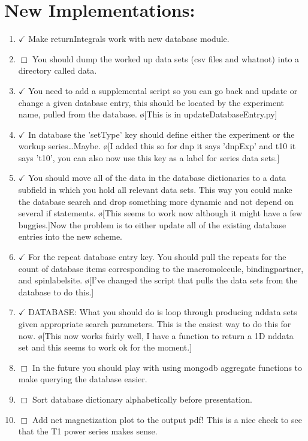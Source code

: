 \documentclass[10pt]{book}
\begin{document}
\section{New Implementations:}
\begin{enumerate}
    \item $\checkmark$ Make returnIntegrals work with new database module.
    \item $\Box$ You should dump the worked up data sets (csv files and whatnot) into a directory called data.
    \item $\checkmark$ You need to add a supplemental script so you can go back and update or change a given database entry, this should be located by the experiment name, pulled from the database. \o[This is in updateDatabaseEntry.py]{}
    \item $\checkmark$ In database the 'setType' key should define either the experiment or the workup series\ldots Maybe. \o[I added this so for dnp it says 'dnpExp' and t10 it says 't10', you can also now use this key as a label for series data sets.]{}
    \item $\checkmark$ You should move all of the data in the database dictionaries to a data subfield in which you hold all relevant data sets. This way you could make the database search and drop something more dynamic and not depend on several if statements. \o[This seems to work now although it might have a few buggies.]{Now the problem is to either update all of the existing database entries into the new scheme.}
    \item $\checkmark$ For the repeat database entry key. You should pull the repeats for the count of database items corresponding to the macromolecule, bindingpartner, and spinlabelsite. \o[I've changed the script that pulls the data sets from the database to do this.]{}
    \item $\checkmark$ DATABASE: What you should do is loop through producing nddata sets given appropriate search parameters. This is the easiest way to do this for now. \o[This now works fairly well, I have a function to return a 1D nddata set and this seems to work ok for the moment.]{}
    \item $\Box$ In the future you should play with using mongodb aggregate functions to make querying the database easier.
    \item $\Box$ Sort database dictionary alphabetically before presentation.
    \item $\Box$ Add net magnetization plot to the output pdf! This is a nice check to see that the T1 power series makes sense.

\end{enumerate}
\end{document}
